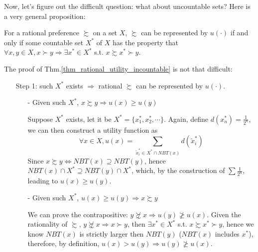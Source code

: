 Now, let's figure out the difficult question: what about uncountable sets? Here is a very general proposition:
\begin{theorem}\label{thm_rational_utility_incountable}
    For a rational preference $\succsim$ on a set $X$, $\succsim$ can be represented by $u(\cdot)$ if and only if some countable set $X^*$ of $X$ has the property that $\forall x,y\in X, x\succ y\Rightarrow \exists x^*\in X^*$ s.t. $x\succsim x^*\succ y$.
\end{theorem}
The proof of Thm.\ref{thm_rational_utility_incountable} is not that difficult:
\begin{enumerate}
    \item[Step 1:] such $X^*$ exists $\Rightarrow$ rational $\succsim$ can be represented by $u(\cdot)$.
    \begin{enumerate}
        \item[-]Given such $X^*$, $x\succsim y\Rightarrow u(x)\geq u(y)$
        
        Suppose $X^*$ exists, let it be $X^*=\{x_1^*,x_2^*,\cdots\}$. Again, define $d(x_n^*)=\frac{1}{2^n}$, we can then construct a utility function as 
        $$\forall x\in X, u(x)=\sum_{\tilde{x}_i^*\in X^*\cap NBT(x)}d(\tilde{x}^*_i)$$
        Since $x\succsim y\Leftrightarrow NBT(x)\supseteq NBT(y)$, hence $NBT(x)\cap X^*\supseteq NBT(y)\cap X^*$, which, by the construction of $\sum\frac{1}{2^n}$, leading to $u(x)\geq u(y)$.

        \item[-] Given such $X^*$, $u(x)\geq u(y)\Rightarrow x\succsim y$
        
        We can prove the contrapositive: $ y\not\succsim x\Rightarrow u(y)\not\geq u(x)$. Given the rationality of $\succsim$, $y\not\succsim x \Rightarrow x\succ y$, then $\exists x^*\in X^*$ s.t. $x\succsim x^* \succ y$, hence we know $NBT(x)$ is strictly larger then $NBT(y)$ ($NBT(x)$ includes $x^*$), therefore, by definition, $u(x)>u(y)\Rightarrow u(y)\not\geq u(x)$.
    \end{enumerate}
    

\end{enumerate}
